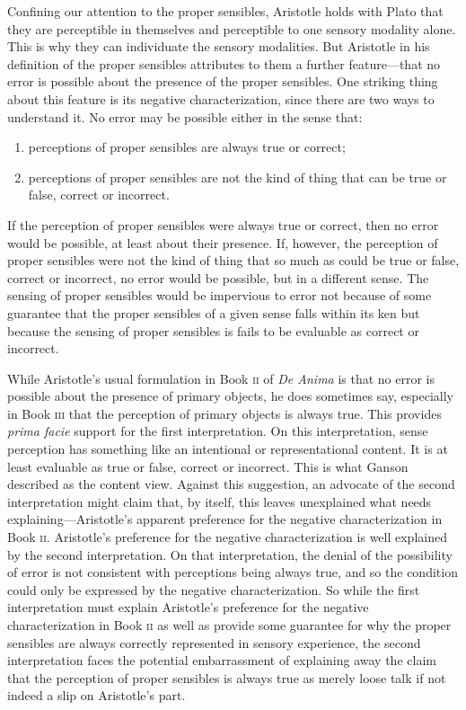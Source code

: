 \documentclass[12pt]{article}
\begin{document}
Confining our attention to the proper sensibles, Aristotle holds with Plato that they are perceptible in themselves and perceptible to one sensory modality alone. This is why they can individuate the sensory modalities. But Aristotle in his definition of the proper sensibles attributes to them a further feature---that no error is possible about the presence of the proper sensibles. One striking thing about this feature is its negative characterization, since there are two ways to understand it. No error may be possible either in the sense that:
\begin{enumerate}
	\item perceptions of proper sensibles are always true or correct;
	\item perceptions of proper sensibles are not the kind of thing that can be true or false, correct or incorrect.
\end{enumerate}
If the perception of proper sensibles were always true or correct, then no error would be possible, at least about their presence. If, however, the perception of proper sensibles were not the kind of thing that so much as could be true or false, correct or incorrect, no error would be possible, but in a different sense. The sensing of proper sensibles would be impervious to error not because of some guarantee that the proper sensibles of a given sense falls within its ken but because the sensing of proper sensibles is fails to be evaluable as correct or incorrect.

While Aristotle's usual formulation in Book \textsc{ii} of \emph{De Anima} is that no error is possible about the presence of primary objects, he does sometimes say, especially in Book \textsc{iii} that the perception of primary objects is always true. This provides \emph{prima facie} support for the first interpretation. On this interpretation, sense perception has something like an intentional or representational content. It is at least evaluable as true or false, correct or incorrect. This is what Ganson described as the content view.  Against this suggestion, an advocate of the second interpretation might claim that, by itself, this leaves unexplained what needs explaining---\-Aristotle's apparent preference for the negative characterization in Book \textsc{ii}. Aristotle's preference for the negative characterization is well explained by the second interpretation. On that interpretation, the denial of the possibility of error is not consistent with perceptions being always true, and so the condition could only be expressed by the negative characterization. So while the first interpretation must explain Aristotle's preference for the negative characterization in Book \textsc{ii} as well as provide some guarantee for why the proper sensibles are always correctly represented in sensory experience, the second interpretation faces the potential embarrassment of explaining away the claim that the perception of proper sensibles is always true as merely loose talk if not indeed a slip on Aristotle's part.
\end{document}
